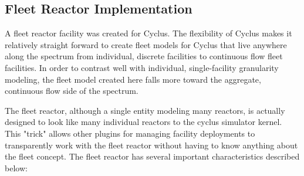 \documentclass{style}
\begin{document}
\subsection{Fleet Reactor Implementation}

A fleet reactor facility was created for Cyclus.  The flexibility of Cyclus
makes it relatively straight forward to create fleet models for Cyclus that
live anywhere along the spectrum from individual, discrete facilities to
continuous flow fleet facilities.  In order to contrast well with individual,
single-facility granularity modeling, the fleet model created here falls more
toward the aggregate, continuous flow side of the spectrum.  

The fleet reactor, although a single entity modeling many reactors, is
actually designed to look like many individual reactors to the cyclus
simulator kernel. This "trick" allows other plugins for managing facility
deployments to transparently work with the fleet reactor without having to
know anything about the fleet concept.  The fleet reactor has several
important characteristics described below:
\end{document}
